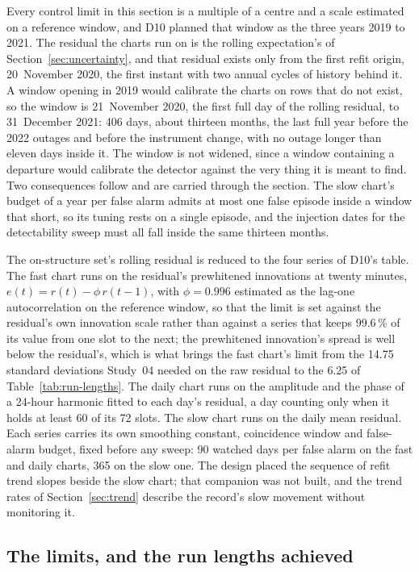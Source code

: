 \documentclass[11pt,a4paper]{article}
\begin{document}
Every control limit in this section is a multiple of a centre and a scale
estimated on a reference window, and D10 planned that window as the three
years 2019 to 2021. The residual the charts run on is the rolling
expectation's of Section~\ref{sec:uncertainty}, and that residual exists only
from the first refit origin, 20~November 2020, the first instant with two
annual cycles of history behind it. A window opening in 2019 would calibrate
the charts on rows that do not exist, so the window is 21~November 2020, the
first full day of the rolling residual, to 31~December 2021: 406 days, about
thirteen months, the last full year before the 2022 outages and before the
instrument change, with no outage longer than eleven days inside it. The
window is not widened, since a window containing a departure would calibrate
the detector against the very thing it is meant to find. Two consequences
follow and are carried through the section. The slow chart's budget of a year
per false alarm admits at most one false episode inside a window that short,
so its tuning rests on a single episode, and the injection dates for the
detectability sweep must all fall inside the same thirteen months.

The on-structure set's rolling residual is reduced to the four series of D10's
table. The fast chart runs on the residual's prewhitened innovations at twenty
minutes, $e(t) = r(t) - \phi\, r(t - 1)$, with $\phi = 0.996$ estimated as the
lag-one autocorrelation on the reference window, so that the limit is set
against the residual's own innovation scale rather than against a series that
keeps 99.6\,\% of its value from one slot to the next; the prewhitened
innovation's spread is well below the residual's, which is what
brings the fast chart's limit from the 14.75 standard deviations Study~04
needed on the raw residual to the 6.25 of Table~\ref{tab:run-lengths}. The
daily chart runs on the amplitude and the phase of a 24-hour harmonic fitted
to each day's residual, a day counting only when it holds at least 60 of its
72 slots. The slow chart runs on the daily mean residual. Each series carries
its own smoothing constant, coincidence window and false-alarm budget, fixed
before any sweep: 90 watched days per false alarm on the fast and daily charts,
365 on the slow one. The design placed the sequence of refit trend slopes
beside the slow chart; that companion was not built, and the trend rates of
Section~\ref{sec:trend} describe the record's slow movement without
monitoring it.

\subsection{The limits, and the run lengths achieved}
\end{document}
